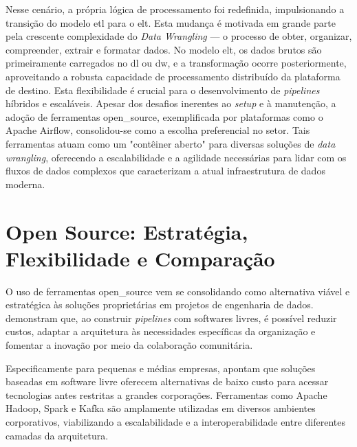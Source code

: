 Nesse cenário, a própria lógica de processamento foi redefinida, impulsionando a transição do modelo \acs{etl} para o \ac{elt}. Esta mudança é motivada em grande parte pela crescente complexidade do \textit{Data Wrangling} — o processo de obter, organizar, compreender, extrair e formatar dados. No modelo \ac{elt}, os dados brutos são primeiramente carregados no \acs{dl} ou \acs{dw}, e a transformação ocorre posteriormente, aproveitando a robusta capacidade de processamento distribuído da plataforma de destino. Esta flexibilidade é crucial para o desenvolvimento de \textit{pipelines} híbridos e escaláveis. Apesar dos desafios inerentes ao \textit{setup} e à manutenção, a adoção de ferramentas \acs{open_source}, exemplificada por plataformas como o Apache Airflow, consolidou-se como a escolha preferencial no setor. Tais ferramentas atuam como um "contêiner aberto" para diversas soluções de \textit{data wrangling}, oferecendo a escalabilidade e a agilidade necessárias para lidar com os fluxos de dados complexos que caracterizam a atual infraestrutura de dados moderna.

\section{Open Source: Estratégia, Flexibilidade e Comparação}
\label{sec:open_source}

O uso de ferramentas \acs{open_source} vem se consolidando como alternativa viável e estratégica às soluções proprietárias em projetos de engenharia de dados. \cite[]{septian2019} demonstram que, ao construir \textit{pipelines} com softwares livres, é possível reduzir custos, adaptar a arquitetura às necessidades específicas da organização e fomentar a inovação por meio da colaboração comunitária.

Especificamente para pequenas e médias empresas, \cite[]{septian2019} apontam que soluções baseadas em software livre oferecem alternativas de baixo custo para acessar tecnologias antes restritas a grandes corporações. Ferramentas como Apache Hadoop, Spark e Kafka são amplamente utilizadas em diversos ambientes corporativos, viabilizando a escalabilidade e a interoperabilidade entre diferentes camadas da arquitetura.

